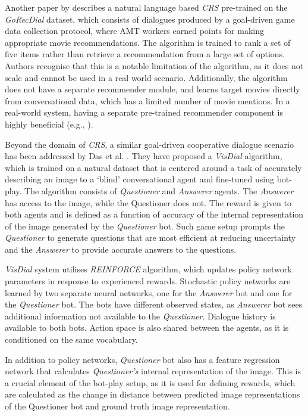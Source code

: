 Another paper by \cite{kang2019recommendation} describes a natural language based \textit{CRS} pre-trained on the \textit{GoRecDial} dataset, which consists of dialogues produced by a goal-driven game data collection protocol, where AMT workers earned points for making appropriate movie recommendations. The algorithm is trained to rank a set of five items rather than retrieve a recommendation from a large set of options. Authors recognise that this is a notable limitation of the algorithm, as it does not scale and cannot be used in a real world scenario. Additionally, the algorithm does not have a separate recommender module, and learns target movies directly from conversational data, which has a limited number of movie mentions. In a real-world system, having a separate pre-trained recommender component is highly beneficial (e.g., \citep{li2018towards}).

Beyond the domain of \textit{CRS}, a similar goal-driven cooperative dialogue scenario has been addressed by Das et al. \citep{das2017learning}. They have proposed a \textit{VisDial} algorithm, which is trained on a natural dataset that is centered around a task of accurately describing an image to a ‘blind’ conversational agent and fine-tuned using bot-play. The algorithm consists of \textit{Questioner} and \textit{Answerer} agents. The \textit{Answerer} has access to the image, while the Questioner does not. The reward is given to both agents and is defined as a function of accuracy of the internal representation of the image generated by the \textit{Questioner} bot. Such game setup prompts the \textit{Questioner} to generate questions that are most efficient at reducing uncertainty and the \textit{Answerer} to provide accurate answers to the questions.

\textit{VisDial} system utilises \textit{REINFORCE} \citep{williams1992simple} algorithm, which updates policy network parameters in response to experienced rewards. Stochastic policy networks are learned by two separate neural networks, one for the \textit{Answerer} bot and one for the \textit{Questioner} bot. The bots have different observed states, as \textit{Answerer} bot sees additional information not available to the \textit{Questioner}. Dialogue history is available to both bots. Action space is also shared between the agents, as it is conditioned on the same vocabulary.

In addition to policy networks, \textit{Questioner} bot also has a feature regression network that calculates \textit{Questioner’s} internal representation of the image. This is a crucial element of the bot-play setup, as it is used for defining rewards, which are calculated as the change in distance between predicted image representations of the Questioner bot and ground truth image representation. 

